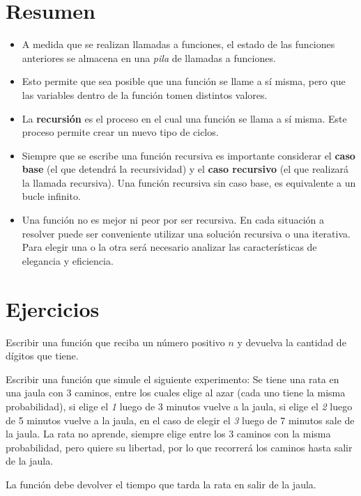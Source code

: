 \section{Resumen}

\begin{itemize}

\item A medida que se realizan llamadas a funciones, el estado de las
funciones anteriores se almacena en una {\it pila} de llamadas a funciones.

\item Esto permite que sea posible que una función se llame a sí misma,
pero que las variables dentro de la función tomen distintos valores.

\item La {\bf recursión} es el proceso en el cual una función se llama a
sí misma.  Este proceso permite crear un nuevo tipo de ciclos.

\item Siempre que se escribe una función recursiva es importante considerar
el {\bf caso base} (el que detendrá la recursividad) y el {\bf caso
recursivo} (el que realizará la llamada recursiva).  Una función recursiva
sin caso base, es equivalente a un bucle infinito.

\item Una función no es mejor ni peor por ser recursiva.  En cada situación
a resolver puede ser conveniente utilizar una solución recursiva o una
iterativa.  Para elegir una o la otra será necesario analizar las
características de elegancia y eficiencia.

\end{itemize}


\newpage
\section{Ejercicios}

\begin{ejercicio}
Escribir una función que reciba un número positivo $n$ y devuelva
la cantidad de dígitos que tiene.
\end{ejercicio}

\begin{ejercicio}
Escribir una función que simule el siguiente experimento:
Se tiene una rata en una jaula con 3 caminos, entre los cuales elige
al azar (cada uno tiene la misma probabilidad), si elige el {\it 1} luego
de 3 minutos vuelve a la jaula, si elige el {\it 2} luego de 5 minutos vuelve a
la jaula, en el caso de elegir el {\it 3} luego de 7 minutos sale de la jaula.
La rata no aprende, siempre elige entre los 3 caminos con la misma probabilidad,
pero quiere su libertad, por lo que recorrerá los caminos hasta salir de la jaula.

La función debe devolver el tiempo que tarda la rata en salir de la jaula.
\end{ejercicio}

